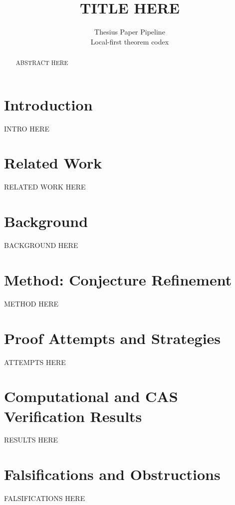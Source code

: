 \documentclass{article} %
\title{TITLE HERE}
\author{Thesius Paper Pipeline\\
Local-first theorem codex\\
}
\theoremstyle{remark}
\begin{document}
\maketitle

\begin{abstract}
ABSTRACT HERE
\end{abstract}

\section{Introduction}
\label{sec:intro}
INTRO HERE

\section{Related Work}
\label{sec:related}
RELATED WORK HERE

\section{Background}
\label{sec:background}
BACKGROUND HERE

\section{Method: Conjecture Refinement}
\label{sec:method}
METHOD HERE

\section{Proof Attempts and Strategies}
\label{sec:attempts}
ATTEMPTS HERE

\section{Computational and CAS Verification Results}
\label{sec:results}
RESULTS HERE


\section{Falsifications and Obstructions}
\label{sec:falsifications}
FALSIFICATIONS HERE
\end{document}
